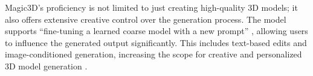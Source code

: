 Magic3D's proficiency is not limited to just creating high-quality 3D models; it also offers extensive creative control over the generation process. The model supports ``fine-tuning a learned coarse model with a new prompt'' \citep{lin2022magic3d}, allowing users to influence the generated output significantly. This includes text-based edits and image-conditioned generation, increasing the scope for creative and personalized 3D model generation \citep{lin2022magic3d}.